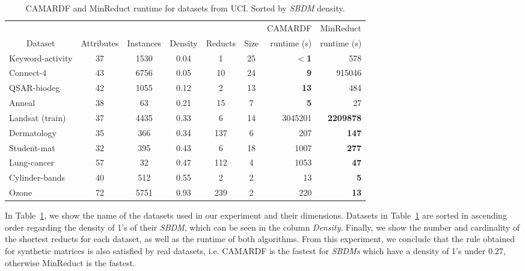 \documentclass[authoryear,11pt]{elsarticle}
\begin{document}
	\begin{table}[htb]
		\centering
		\caption{CAMARDF and MinReduct runtime for datasets from UCI. Sorted by \textit{SBDM} density.}
		\label{tab:density}
		\begin{tabular}{|l|c|c|c|c|c|r|r|}
			\hline
			&&&&&& \multicolumn{1}{c|}{CAMARDF} & \multicolumn{1}{c|}{MinReduct}  \\
			\multicolumn{1}{|c|}{Dataset}       & Attributes & Instances & Density & Reducts & Size & runtime (s)  & runtime (s)  \\
			\hline
			Keyword-activity          & 37 & 1530   & 0.04    & 1   & 25 & \textbf{$<$1} & 578  \\
			Connect-4                 & 43 & 6756   & 0.05    & 10  & 24 & \textbf{9}    &  915046 \\
			QSAR-biodeg               & 42 & 1055   & 0.12    & 2   & 13 & \textbf{13}   & 484 \\
			Anneal                    & 38 & 63     & 0.21    & 15  & 7  & \textbf{5}    & 27 \\
			Landsat (train)           & 37 & 4435   & 0.33    & 6   & 14 & 3045201       & \textbf{2209878} \\
			Dermatology               & 35 & 366    & 0.34    & 137 & 6  & 207           & \textbf{147}   \\
			Student-mat               & 32 & 395    & 0.43    & 6   & 18 & 1007          & \textbf{277}  \\
			Lung-cancer               & 57 & 32     & 0.47    & 112 & 4  & 1053          & \textbf{47}   \\
			Cylinder-bands            & 40 & 512    & 0.55    & 2   & 2  & 13            & \textbf{5}   \\
			Ozone                     & 72 & 5751   & 0.93    & 239 & 2  & 220           & \textbf{13}   \\
			\hline
		\end{tabular}
	\end{table}   
			
  In Table~\ref{tab:density}, we show the name of the datasets used in our experiment and their dimensions. Datasets in Table~\ref{tab:density} are sorted in ascending order regarding the density of 1's of their \textit{SBDM}, which can be seen in the column \textit{Density}. Finally, we show the number and cardinality of the shortest reducts for each dataset, as well as the runtime of both algorithms. From this experiment, we conclude that the rule obtained for synthetic matrices is also satisfied by real datasets, i.e. CAMARDF is the fastest for \textit{SBDMs} which have a density of 1's under 0.27, otherwise MinReduct is the fastest.
  
\end{document}

